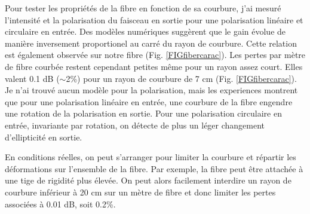 Pour tester les propriétés de la fibre en fonction de sa courbure, j'ai mesuré l'intensité et la polarisation du faisceau en sortie pour une polarisation linéaire et circulaire en entrée. Des modèles numériques \cite{yu_negative_2016} \cite{setti_flexible_2013} \cite{frosz_analytical_2017} suggèrent que le gain évolue de manière inversement proportionel au carré du rayon de courbure. Cette relation est également observée sur notre fibre (Fig. \ref{FIGfibercarac}). Les pertes par mètre de fibre courbée restent cependant petites même pour un rayon assez court. Elles valent 0.1 dB ($\sim$2\%) pour un rayon de courbure de 7 cm (Fig. \ref{FIGfibercarac}). Je n'ai trouvé aucun modèle pour la polarisation, mais les experiences montrent que pour une polarisation linéaire en entrée, une courbure de la fibre engendre une rotation de la polarisation en sortie. Pour une polarisation circulaire en entrée, invariante par rotation, on détecte de plus un léger changement d'ellipticité en sortie.

En conditions réelles, on peut s'arranger pour limiter la courbure et répartir les déformations sur l'ensemble de la fibre. Par exemple, la fibre peut être attachée à une tige de rigidité plus élevée. On peut alors facilement interdire un rayon de courbure inférieur à 20 cm sur un mètre de fibre et donc limiter les pertes associées à 0.01 dB, soit 0.2\%.


